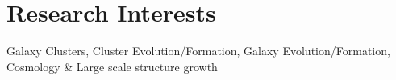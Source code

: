 
\section{Research Interests}

Galaxy Clusters, Cluster Evolution/Formation, Galaxy Evolution/Formation, Cosmology \& Large scale structure growth



